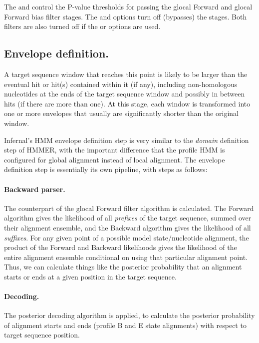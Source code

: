 \begin{sreoutput}
The  and  control the P-value thresholds for
passing the glocal Forward and glocal Forward bias filter stages.  The
 and  options turn off (bypasses) the
stages. Both filters are also turned off if the  or
 options are used.

\subsection{Envelope definition.}

A target sequence window that reaches this point is likely to be
larger than the eventual hit or hit(s) contained within it (if any),
including non-homologous nucleotides at the ends of the target sequence
window and possibly in between hits (if there are more than one). At
this stage, each window is transformed into one or more envelopes that
usually are significantly shorter than the original window. 


Infernal's HMM envelope definition step is very similar to the
\emph{domain} definition step of HMMER, with the important difference
that the profile HMM is configured for global alignment instead of
local alignment.  The envelope definition step is essentially its own
pipeline, with steps as follows:

\paragraph{Backward parser.}
The counterpart of the glocal Forward filter algorithm is calculated.
The Forward algorithm gives the likelihood of all \emph{prefixes} of
the target sequence, summed over their alignment ensemble, and the
Backward algorithm gives the likelihood of all \emph{suffixes}. For
any given point of a possible model state/nucleotide alignment, the
product of the Forward and Backward likelihoods gives the likelihood
of the entire alignment ensemble conditional on using that particular
alignment point. Thus, we can calculate things like the posterior
probability that an alignment starts or ends at a given position in
the target sequence.

\paragraph{Decoding.}
The posterior decoding algorithm is applied, to calculate the
posterior probability of alignment starts and ends (profile B and E
state alignments) with respect to target sequence position.


\end{sreoutput}
